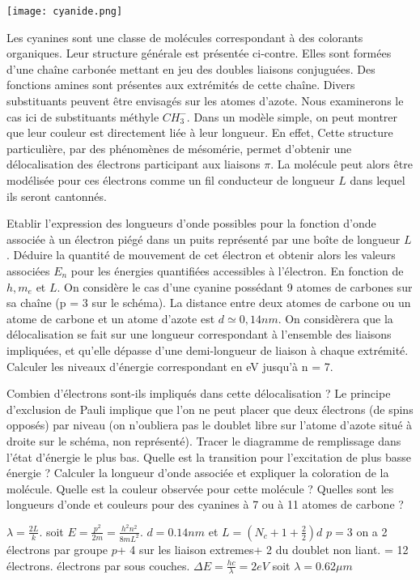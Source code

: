 \begin{Exercise}[title=Cyanide]
  \begin{center}
    \texttt{[image: cyanide.png]}
  \end{center}
  Les cyanines sont une classe de molécules correspondant à des colorants organiques. Leur structure générale est présentée ci-contre. Elles sont formées d’une chaîne carbonée mettant en jeu des doubles liaisons conjuguées. Des fonctions amines sont présentes aux extrémités de cette chaîne. Divers substituants peuvent être envisagés sur les atomes d’azote. Nous examinerons le cas ici de substituants méthyle $CH^{-}_3$. Dans un modèle simple, on peut montrer que leur couleur est directement liée à leur longueur. En effet, Cette structure particulière, par des phénomènes de mésomérie, permet d’obtenir une délocalisation des électrons participant aux liaisons $\pi$. La molécule peut alors être modélisée pour ces électrons comme un fil conducteur de longueur $L$ dans lequel ils seront cantonnés.
  
\Question Etablir l’expression des longueurs d’onde possibles pour la fonction d’onde associée à un électron piégé dans un puits représenté par une boîte de longueur $L$. Déduire la quantité de mouvement de cet électron et obtenir alors les valeurs associées $E_n$ pour les énergies quantifiées accessibles à l’électron. En fonction de $h,m_e$ et $L$. 
\Question On considère le cas d’une cyanine possédant 9 atomes de carbones sur sa chaîne (p = 3 sur le schéma). La distance entre deux atomes de carbone ou un atome de carbone et un atome d’azote est $d\simeq0,14 nm$. On considèrera  que  la  délocalisation  se  fait  sur  une  longueur  correspondant  à  l’ensemble  des  liaisons impliquées, et qu’elle dépasse d’une demi-longueur de liaison à chaque extrémité.  Calculer les niveaux d’énergie correspondant en eV  jusqu’à n = 7.

\Question Combien  d’électrons  sont-ils  impliqués  dans  cette  délocalisation ?  Le  principe  d’exclusion  de  Pauli implique que l’on ne peut placer que deux électrons (de spins opposés) par niveau (on n’oubliera pas le doublet libre sur l’atome d’azote situé à droite sur le schéma, non représenté). Tracer le diagramme de remplissage dans l’état d’énergie le plus bas.
\Question Quelle est la transition pour l’excitation de plus basse énergie ? Calculer la longueur d’onde associée et expliquer la coloration de la molécule. Quelle est la couleur observée pour cette molécule ?
\Question Quelles sont les longueurs d’onde et couleurs pour des cyanines à 7 ou à 11 atomes de carbone ?
\end{Exercise}
\begin{Answer}
  \Question $\lambda = \frac{2L}{k}$. soit $E=\frac{p^2}{2m}=\frac{h^2n^2}{8mL^2}$.
  \Question $d =0.14nm $ et $ L = (N_c+1+\frac{2}{2})d$
  \Question $p=3$ on a 2 électrons par groupe $p$+ 4 sur les liaison extremes+ 2 du doublet non liant. = 12 électrons.
   électrons par sous couches.
  \Question $\Delta E =\frac{hc}{\lambda}=2eV $ soit $\lambda = 0.62\mu m$
\end{Answer}
